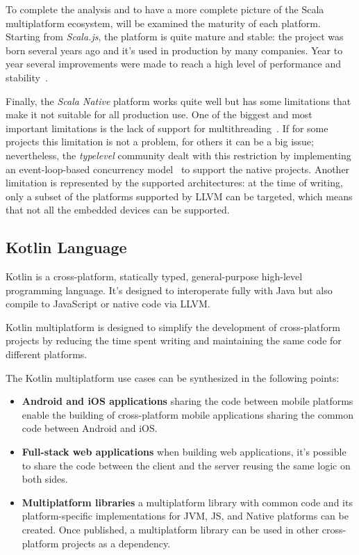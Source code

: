 To complete the analysis and to have a more complete picture of the Scala multiplatform ecosystem, will be examined the maturity of each platform.
Starting from \emph{Scala.js}, the platform is quite mature and stable: the project was born several years ago and it's used in production by many
companies. Year to year several improvements were made to reach a high level of performance and stability~\cite{scala-js-performance, marr2016cross}.

Finally, the \emph{Scala Native} platform works quite well but has some limitations that make it not suitable for all production use.
One of the biggest and most important limitations is the lack of support for multithreading~\cite{scala-native-multithreading}.
If for some projects this limitation is not a problem, for others it can be a big issue; nevertheless, the \emph{typelevel} community dealt with this
restriction by implementing an event-loop-based concurrency model~\cite{scala-native-multithreading} to support the native projects.
Another limitation is represented by the supported architectures: at the time of writing, only a subset of the platforms supported by LLVM
can be targeted, which means that not all the embedded devices can be supported.

\subsection{Kotlin Language}
\label{sec:kotlin-language}

Kotlin is a cross-platform, statically typed, general-purpose high-level programming language.
It's designed to interoperate fully with Java but also compile to JavaScript or native code via LLVM.

Kotlin multiplatform is designed to simplify the development of cross-platform projects by reducing the time spent writing and maintaining the same
code for different platforms.

The Kotlin multiplatform use cases can be synthesized in the following points:
\begin{itemize}
	\item \textbf{Android and iOS applications} sharing the code between mobile platforms enable the building of cross-platform mobile applications
	      sharing the common code between Android and iOS.
	\item \textbf{Full-stack web applications} when building web applications, it's possible to share the code between the client and the server
	      reusing the same logic on both sides.
	\item \textbf{Multiplatform libraries} a multiplatform library with common code and its platform-specific implementations for JVM, JS, and Native platforms can be created. Once published, a multiplatform library can be used in other cross-platform projects as a dependency.
\end{itemize}

